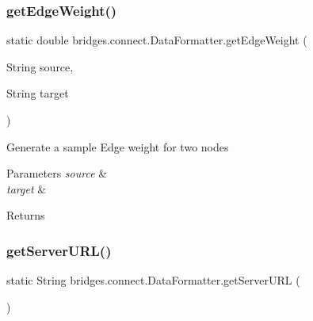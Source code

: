 \subsubsection{\texorpdfstring{get\+Edge\+Weight()}{getEdgeWeight()}}
{\footnotesize\ttfamily static double bridges.\+connect.\+Data\+Formatter.\+get\+Edge\+Weight (\begin{DoxyParamCaption}\item[{String}]{source,  }\item[{String}]{target }\end{DoxyParamCaption})\hspace{0.3cm}{\ttfamily [static]}}

Generate a sample Edge weight for two nodes 
\begin{DoxyParams}{Parameters}
{\em source} & \\
\hline
{\em target} & \\
\hline
\end{DoxyParams}
\begin{DoxyReturn}{Returns}

\end{DoxyReturn}
\hypertarget{classbridges_1_1connect_1_1_data_formatter_a4abc8f8b0970d6c07c680ac485e299c7}{}\label{classbridges_1_1connect_1_1_data_formatter_a4abc8f8b0970d6c07c680ac485e299c7} 
\subsubsection{\texorpdfstring{get\+Server\+U\+R\+L()}{getServerURL()}}
{\footnotesize\ttfamily static String bridges.\+connect.\+Data\+Formatter.\+get\+Server\+U\+RL (\begin{DoxyParamCaption}{ }\end{DoxyParamCaption})\hspace{0.3cm}{\ttfamily [static]}}

\hypertarget{classbridges_1_1connect_1_1_data_formatter_a3d0b2d2e0384d2a537bb61fbeb3d00a4}{}\label{classbridges_1_1connect_1_1_data_formatter_a3d0b2d2e0384d2a537bb61fbeb3d00a4} 
